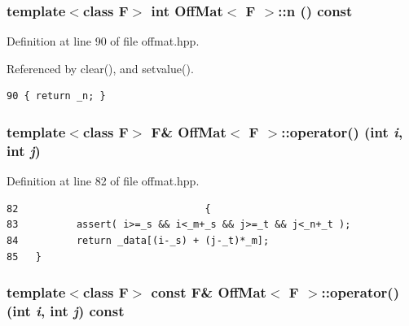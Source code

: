 \subsubsection{\setlength{\rightskip}{0pt plus 5cm}template$<$class F$>$ int {\bf Off\-Mat}$<$ F $>$::n () const\hspace{0.3cm}{\tt  [inline]}}\label{classOffMat_611a0b095fab035a528671dd8cf7f3b7_611a0b095fab035a528671dd8cf7f3b7}




Definition at line 90 of file offmat.hpp.

Referenced by clear(), and setvalue().

\footnotesize\begin{verbatim}90 { return _n; }
\end{verbatim}\normalsize 


\subsubsection{\setlength{\rightskip}{0pt plus 5cm}template$<$class F$>$ F\& {\bf Off\-Mat}$<$ F $>$::operator() (int {\em i}, int {\em j})\hspace{0.3cm}{\tt  [inline]}}\label{classOffMat_743eed4071652374b372885106b9142f_743eed4071652374b372885106b9142f}




Definition at line 82 of file offmat.hpp.

\footnotesize\begin{verbatim}82                                {
83          assert( i>=_s && i<_m+_s && j>=_t && j<_n+_t );
84          return _data[(i-_s) + (j-_t)*_m];
85   }
\end{verbatim}\normalsize 


\subsubsection{\setlength{\rightskip}{0pt plus 5cm}template$<$class F$>$ const F\& {\bf Off\-Mat}$<$ F $>$::operator() (int {\em i}, int {\em j}) const\hspace{0.3cm}{\tt  [inline]}}\label{classOffMat_08092f91032a8a0df0ad0870710e6a7a_08092f91032a8a0df0ad0870710e6a7a}





